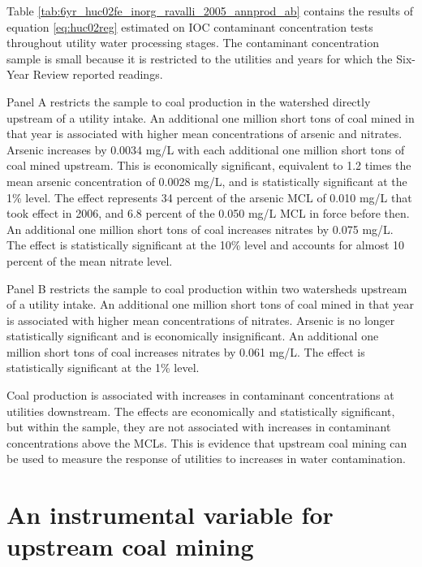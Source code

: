 \documentclass[12pt]{article}
\begin{document}
Table \ref{tab:6yr_huc02fe_inorg_ravalli_2005_annprod_ab} contains the results of equation \ref{eq:huc02reg} estimated on IOC contaminant concentration tests throughout utility water processing stages. The contaminant concentration sample is small because it is restricted to the utilities and years for which the Six-Year Review reported readings. 

Panel A restricts the sample to coal production in the watershed directly upstream of a utility intake. An additional one million short tons of coal mined in that year is associated with higher mean concentrations of arsenic and nitrates. Arsenic increases by 0.0034 mg/L with each additional one million short tons of coal mined upstream. This is economically significant, equivalent to 1.2 times the mean arsenic concentration of 0.0028 mg/L, and is statistically significant at the 1\% level. The effect represents 34 percent of the arsenic MCL of 0.010 mg/L that took effect in 2006, and 6.8 percent of the 0.050 mg/L MCL in force before then. An additional one million short tons of coal increases nitrates by 0.075 mg/L. The effect is statistically significant at the 10\% level and accounts for almost 10 percent of the mean nitrate level.

Panel B restricts the sample to coal production within two watersheds upstream of a utility intake. An additional one million short tons of coal mined in that year is associated with higher mean concentrations of nitrates. Arsenic is no longer statistically significant and is economically insignificant. An additional one million short tons of coal increases nitrates by 0.061 mg/L. The effect is statistically significant at the 1\% level. 

Coal production is associated with increases in contaminant concentrations at utilities downstream. The effects are economically and statistically significant, but within the sample, they are not associated with increases in contaminant concentrations above the MCLs. This is evidence that upstream coal mining can be used to measure the response of utilities to increases in water contamination.

\section{An instrumental variable for upstream coal mining}\label{sec:iv}
\end{document}
